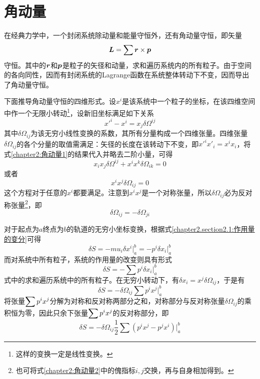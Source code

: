 \section{角动量}

在经典力学中，一个封闭系统除动量和能量守恒外，还有角动量守恒，即矢量
\begin{equation*}
	\boldsymbol{L} = \sum \boldsymbol{r}\times \boldsymbol{p}
\end{equation*}
守恒。其中的$\boldsymbol{r}$和$\boldsymbol{p}$是粒子的矢径和动量，求和遍历系统内的所有粒子。由于空间的各向同性，因而有封闭系统的Lagrange函数在系统整体转动下不变，因而导出了角动量守恒。

下面推导角动量守恒的四维形式。设$x^i$是该系统中一个粒子的坐标，在该四维空间中作一个无限小转动\footnote{这样的变换一定是线性变换。}，设新旧坐标满足如下关系
\begin{equation}
	x'^i-x^i = x_j\delta \varOmega^{ij}
	\label{chapter2:角动量1}
\end{equation}
其中$\delta \varOmega_{ij}$为该无穷小线性变换的系数，其所有分量构成一个四维张量。四维张量$\delta\varOmega_{ij}$的各个分量的取值需满足：矢径的长度在该转动下不变，即$x'^ix'_i = x^ix_i$，将式\eqref{chapter2:角动量1}的结果代入并略去二阶小量，可得
\begin{equation*}
	x_ix_j\delta \varOmega^{ij}+x^ix^k\delta \varOmega_{ik} = 0
\end{equation*}
或者
\begin{equation}
	x^ix^j \delta\varOmega_{ij} = 0
	\label{chapter2:角动量2}
\end{equation}
这个方程对于任意的$x^i$都要满足。注意到$x^ix^j$是一个对称张量，所以$\delta\varOmega_{ij}$必为反对称张量\footnote{也可将式\eqref{chapter2:角动量2}中的傀指标$i, j$交换，再与自身相加得到。}，即
\begin{equation}
	\delta \varOmega_{ij} = -\delta \varOmega_{ji}
	\label{chapter2:角动量3}
\end{equation}

对于起点为$a$终点为$b$的轨道的无穷小坐标变换，根据式\eqref{chapter2.section2.1:作用量的变分}可得
\begin{equation*}
	\delta S = -mu_i\delta x^i \big|_a^b = -p^i\delta x_i\big|_a^b
\end{equation*}
而对系统中所有粒子，系统的作用量的改变则具有形式
\begin{equation*}
	\delta S = -\sum p^i\delta x_i\Big|_a^b
\end{equation*}
式中的求和遍历系统中的所有粒子。在无穷小转动下，有$\delta x_i = x^j\delta \varOmega_{ij}$，于是有
\begin{equation*}
	\delta S = -\delta \varOmega_{ij} \sum p^ix^j\Big|_a^b
\end{equation*}
将张量$\displaystyle\sum p^ix^j$分解为对称和反对称两部分之和，对称部分与反对称张量$\delta \varOmega_{ij}$的乘积恒为零，因此只余下张量$\displaystyle\sum p^ix^j$的反对称部分，即
\begin{equation}
	\delta S = -\delta \varOmega_{ij} \frac12 \sum (p^ix^j-p^jx^i)\Big|_a^b
	\label{chapter2:角动量4}
\end{equation}

